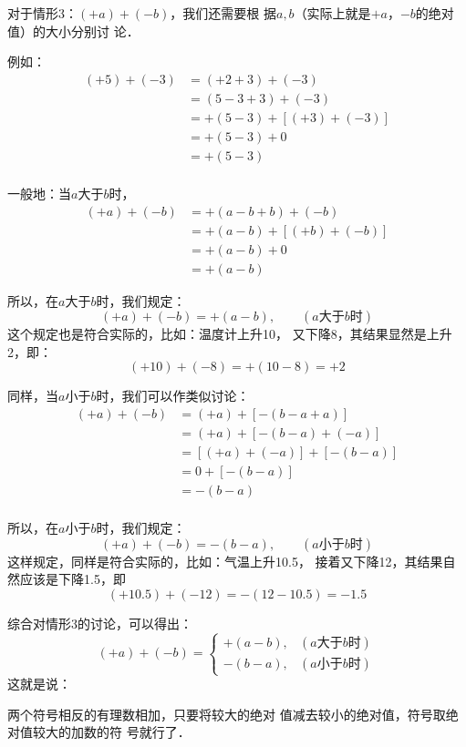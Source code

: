 对于情形3：$(+a)+(-b)$，我们还需要根
据$a,b$（实际上就是$+a$，$-b$的绝对值）的大小分别讨
论．

例如：
\begin{align*}
    (+5)+(-3)&=(+2+3)+(-3)\\
    &=(5-3 + 3)+(-3)\\
    &=+(5-3)+[(+3)+(-3)]\tag{加法结合律}\\
                      &=+(5-3)+0 \tag{相反数的性质}\\
                      &=+(5-3)\tag{零的特性}\\
\end{align*}

一般地：当$a$大于$b$时，
\begin{align*}
    (+ a)+(-b)&=+(a-b + b)+(-b)\\
    &=+(a-b)+[(+b)+(-b)]    \tag{加法结合律}\\
 & =+(a-b) + 0 \tag{零的特性}\\
  &  =+(a-b)
\end{align*}

所以，在$a$大于$b$时，我们规定：
\[(+a)+(-b)=+(a-b),\qquad (\text{$a$大于$b$时})\]
这个规定也是符合实际的，比如：温度计上升10\oc，
又下降8\oc，其结果显然是上升2\oc，即：
     \[     (+10)+(-8)=+(10-8)=+2\]

    同样，当$a$小于$b$时，我们可以作类似讨论：
\begin{align*}
    (+ a)+(-b)&=(+ a)+[-(b-a+a)]\\
   & =(+ a)+[-(b-a)+( -a)]   \tag{情形2加法法则}\\
  &=[(+ a)+(-a)]+[-(b-a) ]  \tag{加法交换、结合律}\\
&=0+[-(b-a)]\tag{相反数的特性}\\
&=-(b-a)\tag{零的特性}\\
\end{align*}

     
    所以，在$a$小于$b$时，我们规定：
    \[(+a)+(-b)=-(b-a),\qquad (\text{$a$小于$b$时})\]
这样规定，同样是符合实际的，比如：气温上升10.5\oc，
接着又下降12\oc，其结果自然应该是下降1.5\oc，即
\[(+10.5)+(-12)=-(12-10.5)=-1.5\]

综合对情形3的讨论，可以得出：
\[(+a)+(-b)=\begin{cases}
    +(a-b),& (\text{$a$大于$b$时})\\
    -(b-a),& (\text{$a$小于$b$时})
\end{cases}\]
这就是说：

    \begin{blk}{}
        两个符号相反的有理数相加，只要将较大的绝对
值减去较小的绝对值，符号取绝对值较大的加数的符
号就行了．
    \end{blk}
    

